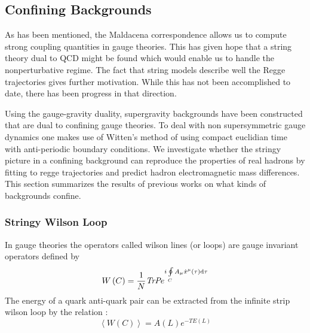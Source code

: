 \documentclass[11pt,a4paper]{article}
\begin{document}
\FloatBarrier
\subsection{Confining Backgrounds}
As has been mentioned, the Maldacena correspondence allows us to compute strong coupling quantities in gauge theories. This has given hope that a string theory dual to QCD might be found which would enable us to handle the nonperturbative regime. The fact that string models describe well the Regge trajectories gives further motivation. While this has not been accomplished to date, there has been progress in that direction.

Using the gauge-gravity duality, supergravity backgrounds have been constructed that are dual to confining gauge theories. To deal with non supersymmetric gauge dynamics one makes use of Witten's method \cite{Witten98,Kuperstein04} of  using compact euclidian time with anti-periodic boundary conditions. We investigate whether the stringy picture in a confining background can reproduce the properties of real hadrons by fitting to regge trajectories and predict hadron electromagnetic mass differences. This section summarizes the results of previous works on what kinds of backgrounds confine.  

\FloatBarrier
\subsubsection{Stringy Wilson Loop}
In gauge theories the operators called wilson lines (or loops) are gauge invariant operators defined by
\begin{equation}
W\left(C\right)=\frac{1}{N}\emph{TrP} e^{i\oint\limits_CA_\mu \dot{x}^\mu\left(\tau\right)\mathrm{d}\tau }
\end{equation}
The energy of a quark anti-quark pair can be extracted from the infinite strip wilson loop by the relation \cite{Sonnenschein00}:
\begin{equation}
\left\langle W\left(C\right)\right\rangle=A\left(L\right)e^{-TE\left(L\right)}
\end{equation}

\end{document}
